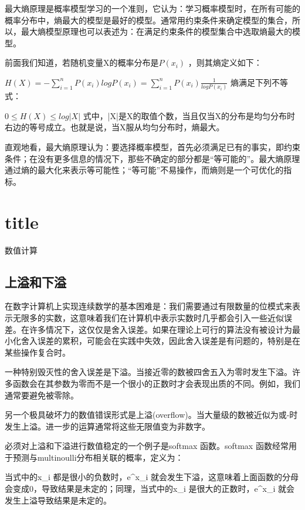 \documentclass[11pt]{book}
\newcounter{#2}
\newcounter{#2}[#1]
\numberwithin{#2}{#1}
\begin{document}
最大熵原理是概率模型学习的一个准则，它认为：学习概率模型时，在所有可能的概率分布中，熵最大的模型是最好的模型。通常用约束条件来确定模型的集合，所以，最大熵模型原理也可以表述为：在满足约束条件的模型集合中选取熵最大的模型。

前面我们知道，若随机变量X的概率分布是$ P\left( x_{i}  \right) $ ，则其熵定义如下：

$ H\left( X \right) =-\sum_{i=1}^{n}{P\left( x_{i}  \right) logP\left( x_{i}  \right) } =\sum_{i=1}^{n}{P\left( x_{i}  \right) \frac{1}{logP\left( x_{i}  \right) } } $ 
熵满足下列不等式：

$ 0\leq H\left( X \right) \leq log\left| X \right|  $
式中，|X|是X的取值个数，当且仅当X的分布是均匀分布时右边的等号成立。也就是说，当X服从均匀分布时，熵最大。

直观地看，最大熵原理认为：要选择概率模型，首先必须满足已有的事实，即约束条件；在没有更多信息的情况下，那些不确定的部分都是“等可能的”。最大熵原理通过熵的最大化来表示等可能性；“等可能”不易操作，而熵则是一个可优化的指标。


\section{title}数值计算

\subsection{上溢和下溢}

在数字计算机上实现连续数学的基本困难是：我们需要通过有限数量的位模式来表示无限多的实数，这意味着我们在计算机中表示实数时几乎都会引入一些近似误差。在许多情况下，这仅仅是舍入误差。如果在理论上可行的算法没有被设计为最小化舍入误差的累积，可能会在实践中失效，因此舍入误差是有问题的，特别是在某些操作复合时。

一种特别毁灭性的舍入误差是下溢。当接近零的数被四舍五入为零时发生下溢。许多函数会在其参数为零而不是一个很小的正数时才会表现出质的不同。例如，我们通常要避免被零除。

另一个极具破坏力的数值错误形式是上溢(overflow)。当大量级的数被近似为\varpi 或-\varpi 时发生上溢。进一步的运算通常将这些无限值变为非数字。

必须对上溢和下溢进行数值稳定的一个例子是softmax 函数。softmax 函数经常用于预测与multinoulli分布相关联的概率，定义为：

当式中的x_{i} 都是很小的负数时，e^{x_{i} } 就会发生下溢，这意味着上面函数的分母会变成0，导致结果是未定的；同理，当式中的x_{i} 是很大的正数时，e^{x_{i} } 就会发生上溢导致结果是未定的。
\end{document}
